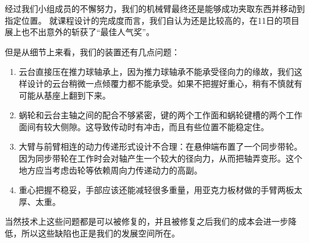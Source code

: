 
\begin{summary}
    经过我们小组成员的不懈努力，我们的机械臂最终还是能够成功夹取东西并移动到指定位置。
    就课程设计的完成度而言，我们自认为还是比较高的，在11日的项目展上也不出意外的斩获了“最佳人气奖”。
    
    但是从细节上来看，我们的装置还有几点问题：
    \begin{enumerate}
        \item   云台直接压在推力球轴承上，因为推力球轴承不能承受径向力的缘故，我们这样设计的云台稍微一点倾覆力都不能承受。如果不把握好重心，稍有不慎就有可能从基座上翻到下来。
        \item   蜗轮和云台主轴之间的配合不够紧密，键的两个工作面和蜗轮键槽的两个工作面间有较大侧隙。这导致传动时有冲击，而且有些位置不能稳定住。
        \item   大臂与前臂相连的动力传递形式设计不合理：在悬伸端布置了一个同步带轮。因为同步带轮在工作时会对轴产生一个较大的径向力，从而把轴弄变形。这个地方应当考虑齿轮等依赖周向力传递动力的高副。
        \item   重心把握不稳妥，手部应该还能减轻很多重量，用亚克力板材做的手臂两板太厚、太重。
    \end{enumerate}

    当然技术上这些问题都是可以被修复的，并且被修复之后我们的成本会进一步降低，所以这些缺陷也正是我们的发展空间所在。

\end{summary}
